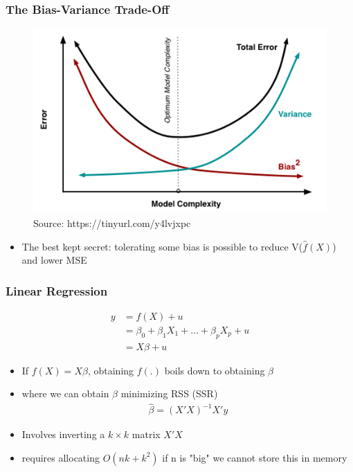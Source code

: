\documentclass[
  shownotes,
  xcolor={svgnames},
  hyperref={colorlinks,citecolor=DarkBlue,linkcolor=andesred,urlcolor=DarkBlue}
  , aspectratio=169]{beamer}
\begin{document}
\begin{frame}
\frametitle{The Bias-Variance Trade-Off}
\begin{figure}[H] \centering
  \centering
  \includegraphics[scale=0.35]{figures/medium_bias_variance_trade_off.png}
  \\
  \tiny
  Source: https://tinyurl.com/y4lvjxpc
\end{figure}
\begin{itemize}
  
  \item The best kept secret: tolerating some bias is possible to reduce V($\hat f(X)$) and lower MSE
  
\end{itemize}

\end{frame}

\begin{frame}
\frametitle{Linear Regression}

\begin{align}
y&=f(X)+u \\
  & = \beta_0 + \beta_1 X_1 + \dots + \beta_p X_p  + u \\
  &= X\beta + u
\end{align}


\begin{itemize}
\item  If $f(X)=X\beta$, obtaining $f(.)$ boils down to obtaining $\beta$

 \medskip
\item where  we can obtain $\beta$ minimizing RSS (SSR)
 \medskip
\begin{align}
\hat \beta=(X'X)^{-1}X'y
\end{align}

 \medskip
\item Involves inverting a $k\times k$ matrix $X'X$
 \medskip
\item requires allocating $O (nk+k^2)$ if n is "big" we cannot store this in memory

\end{itemize} 

\end{frame}
\end{document}
